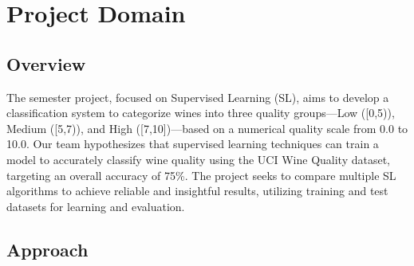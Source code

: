 \documentclass{article}
\theoremstyle{plain}
\theoremstyle{definition}
\theoremstyle{remark}
\begin{document}


\section{Project Domain}

\subsection{Overview}

The semester project, focused on Supervised Learning (SL), aims to develop a classification system to categorize wines into three quality groups—Low ([0,5)), Medium ([5,7)), and High ([7,10])—based on a numerical quality scale from 0.0 to 10.0. Our team hypothesizes that supervised learning techniques can train a model to accurately classify wine quality using the UCI Wine Quality dataset, targeting an overall accuracy of 75\%. The project seeks to compare multiple SL algorithms to achieve reliable and insightful results, utilizing training and test datasets for learning and evaluation.

\subsection{Approach} 
\end{document}
